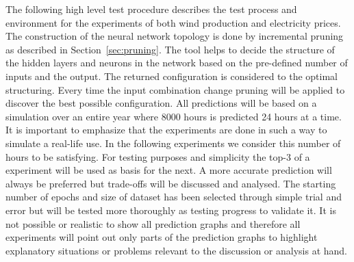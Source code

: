 The following high level test procedure describes the test process and environment for the experiments of both wind production and electricity prices. 
\\[0.5cm]
The construction of the neural network topology is done by incremental pruning as described in Section~\ref{sec:pruning}. The tool helps to decide the structure of the hidden layers and neurons in the network based on the pre-defined number of inputs and the output. The returned configuration is considered to the optimal structuring. Every time the input combination change pruning will be applied to discover the best possible configuration. All predictions will be based on a simulation over an entire year where 8000 hours is predicted 24 hours at a time. It is important to emphasize that the experiments are done in such a way to simulate a real-life use. In the following experiments we consider this number of hours to be satisfying.  For testing purposes and simplicity the top-3 of a experiment will be used as basis for the next. A more accurate prediction will always be preferred but trade-offs will be discussed and analysed. The starting number of epochs and size of dataset has been selected through simple trial and error but will be tested more thoroughly as testing progress to validate it. It is not possible or realistic to show all prediction graphs and therefore all experiments will point out only parts of the prediction graphs to highlight explanatory situations or problems relevant to the discussion or analysis at hand.     

